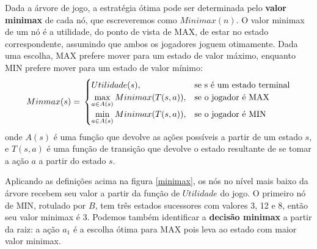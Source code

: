 Dada a árvore de jogo, a estratégia ótima pode ser determinada pelo \textbf{valor minimax} de cada nó, que escreveremos como $Minimax(n)$. O valor minimax de um nó é a utilidade, do ponto de vista de MAX, de estar no estado correspondente, assumindo que ambos os jogadores joguem otimamente. Dada uma escolha, MAX prefere mover para um estado de valor máximo, enquanto MIN prefere mover para um estado de valor mínimo:
\begin{equation*}
  Minmax(s) = \\
  \begin{cases} Utilidade(s), &\textrm{se s é um estado terminal}\\
                \max\limits_{a\in A(s)}Minimax(T(s,a)), &\textrm{se o jogador é MAX}\\
                \min\limits_{a\in A(s)}Minimax(T(s,a)), &\textrm{se o jogador é MIN}\\
  \end{cases}
\end{equation*}
onde $A(s)$ é uma função que devolve as ações possíveis a partir de um estado $s$, e $T(s, a)$ é uma função de transição que devolve o estado resultante de se tomar a ação $a$ a partir do estado $s$.

Aplicando as definições acima na figura \ref{minimax}, os nós no nível mais baixo da árvore recebem seu valor a partir da função de $Utilidade$ do jogo. O primeiro nó de MIN, rotulado por $B$, tem três estados sucessores com valores 3, 12 e 8, então seu valor minimax é 3. Podemos também identificar a \textbf{decisão minimax} a partir da raiz: a ação $a_1$ é a escolha ótima para MAX pois leva ao estado com maior valor minimax.
